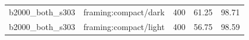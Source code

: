 \begin{longtable}{l>{\raggedright\arraybackslash}p{.42\linewidth}rrr}
b2000\_\allowbreak{}both\_\allowbreak{}s303 & %
framing:compact/dark & %
400 & %
61.25 & %
98.71 \\ %

b2000\_\allowbreak{}both\_\allowbreak{}s303 & %
framing:compact/light & %
400 & %
56.75 & %
98.59 \\ %


\end{longtable}
